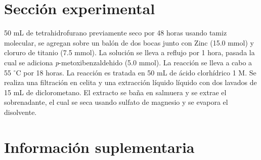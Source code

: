 \documentclass[fleqn,10pt]{SelfArx}
\begin{document}
\section{Secci\'on experimental}
50 mL de tetrahidrofurano previamente seco por 48 horas usando tamiz molecular, se agregan sobre un bal\'on de dos bocas junto con Zinc (15.0 mmol) y cloruro de titanio (7.5 mmol). La soluci\'on se lleva a reflujo por 1 hora, pasada la cual se adiciona \textit{p}-metoxibenzaldehido (5.0 mmol). La reacci\'on se lleva a cabo a 55 $^\circ$C por 18 horas. La reacci\'on es tratada en 50 mL de \'acido clorh\'idrico 1 M. Se realiza una filtraci\'on en celita y una extracci\'on l\'iquido l\'iquido con dos lavados de 15 mL de diclorometano. El extracto se baña en salmuera y se extrae el sobrenadante, el cual se seca usando sulfato de magnesio y se evapora el disolvente.



\newpage
\onecolumn
\section{Informaci\'on suplementaria}\label{sec: complementaria}
\end{document}

